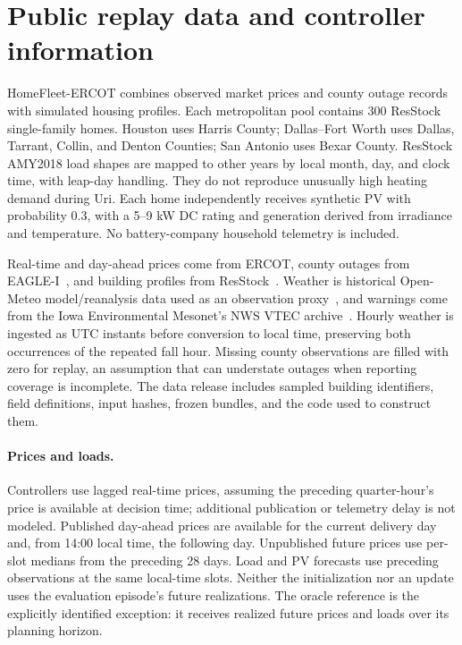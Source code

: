\section{Public replay data and controller information}
\label{sec:data}

HomeFleet-ERCOT combines observed market prices and county outage records with simulated housing profiles. Each metropolitan pool contains 300 ResStock single-family homes. Houston uses Harris County; Dallas--Fort Worth uses Dallas, Tarrant, Collin, and Denton Counties; San Antonio uses Bexar County. ResStock AMY2018 load shapes are mapped to other years by local month, day, and clock time, with leap-day handling. They do not reproduce unusually high heating demand during Uri. Each home independently receives synthetic PV with probability 0.3, with a 5--9 kW DC rating and generation derived from irradiance and temperature. No battery-company household telemetry is included.

Real-time and day-ahead prices come from ERCOT, county outages from EAGLE-I~\citep{brelsford2024eaglei,eaglei_v4}, and building profiles from ResStock~\citep{resstock2024}. Weather is historical Open-Meteo model/reanalysis data used as an observation proxy~\citep{openmeteo_archive}, and warnings come from the Iowa Environmental Mesonet's NWS VTEC archive~\citep{iem_vtec}. Hourly weather is ingested as UTC instants before conversion to local time, preserving both occurrences of the repeated fall hour. Missing county observations are filled with zero for replay, an assumption that can understate outages when reporting coverage is incomplete. The data release includes sampled building identifiers, field definitions, input hashes, frozen bundles, and the code used to construct them.

\paragraph{Prices and loads.}
Controllers use lagged real-time prices, assuming the preceding quarter-hour's price is available at decision time; additional publication or telemetry delay is not modeled. Published day-ahead prices are available for the current delivery day and, from 14:00 local time, the following day. Unpublished future prices use per-slot medians from the preceding 28 days. Load and PV forecasts use preceding observations at the same local-time slots. Neither the initialization nor an update uses the evaluation episode's future realizations. The oracle reference is the explicitly identified exception: it receives realized future prices and loads over its planning horizon.

